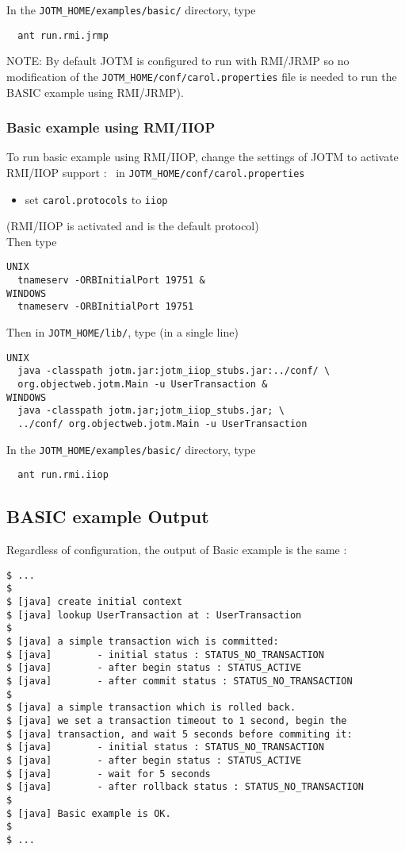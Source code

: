 \documentclass[a4paper,11pt]{article}
\begin{document}
\noindent In the \texttt{JOTM\_HOME/examples/basic/} directory, type
\begin{verbatim}
  ant run.rmi.jrmp
\end{verbatim}
\noindent NOTE: By default JOTM is configured to run with RMI/JRMP so no modification
of the \texttt{JOTM\_HOME/conf/carol.properties} file is needed to run the 
BASIC example using RMI/JRMP).

\subsubsection{Basic example using RMI/IIOP}
To run basic example using RMI/IIOP,  change the settings of JOTM
to activate RMI/IIOP support : \
in \texttt{JOTM\_HOME/conf/carol.properties}
\begin{itemize}
\item set \texttt{carol.protocols} to \texttt{iiop}
\end{itemize}
(RMI/IIOP is activated and is the default protocol)\\

\noindent Then type
\begin{verbatim}
UNIX
  tnameserv -ORBInitialPort 19751 &
WINDOWS
  tnameserv -ORBInitialPort 19751
\end{verbatim}
Then in \texttt{JOTM\_HOME/lib/}, type (in a single line)
\begin{verbatim}
UNIX
  java -classpath jotm.jar:jotm_iiop_stubs.jar:../conf/ \
  org.objectweb.jotm.Main -u UserTransaction &
WINDOWS
  java -classpath jotm.jar;jotm_iiop_stubs.jar; \
  ../conf/ org.objectweb.jotm.Main -u UserTransaction 
\end{verbatim}

\noindent In the \texttt{JOTM\_HOME/examples/basic/} directory, type
\begin{verbatim}
  ant run.rmi.iiop
\end{verbatim}

\subsection{BASIC example Output}
\label{sec:basic_output}
Regardless of configuration, the output of Basic example is
the same :
\begin{verbatim}
$ ...
$
$ [java] create initial context
$ [java] lookup UserTransaction at : UserTransaction
$
$ [java] a simple transaction wich is committed:
$ [java]        - initial status : STATUS_NO_TRANSACTION
$ [java]        - after begin status : STATUS_ACTIVE
$ [java]        - after commit status : STATUS_NO_TRANSACTION
$
$ [java] a simple transaction which is rolled back.
$ [java] we set a transaction timeout to 1 second, begin the
$ [java] transaction, and wait 5 seconds before commiting it:
$ [java]        - initial status : STATUS_NO_TRANSACTION
$ [java]        - after begin status : STATUS_ACTIVE
$ [java]        - wait for 5 seconds
$ [java]        - after rollback status : STATUS_NO_TRANSACTION
$
$ [java] Basic example is OK.
$
$ ...
\end{verbatim}
\end{document}
